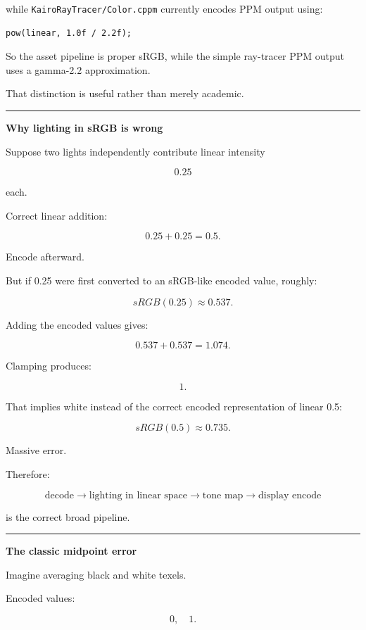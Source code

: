 while \texttt{KairoRayTracer/Color.cppm} currently encodes PPM output using:

\begin{verbatim}
pow(linear, 1.0f / 2.2f);
\end{verbatim}

So the asset pipeline is proper sRGB, while the simple ray-tracer PPM output uses a gamma-2.2 approximation.

That distinction is useful rather than merely academic.

\begin{center}\rule{0.5\linewidth}{0.5pt}\end{center}

\textbf{Why lighting in sRGB is wrong}

Suppose two lights independently contribute linear intensity

\[
0.25
\]

each.

Correct linear addition:

\[
0.25+0.25=0.5.
\]

Encode afterward.

But if 0.25 were first converted to an sRGB-like encoded value, roughly:

\[
sRGB(0.25)\approx0.537.
\]

Adding the encoded values gives:

\[
0.537+0.537=1.074.
\]

Clamping produces:

\[
1.
\]

That implies white instead of the correct encoded representation of linear 0.5:

\[
sRGB(0.5)\approx0.735.
\]

Massive error.

Therefore:

\[
\boxed{
\text{decode}
\rightarrow
\text{lighting in linear space}
\rightarrow
\text{tone map}
\rightarrow
\text{display encode}
}
\]

is the correct broad pipeline.

\begin{center}\rule{0.5\linewidth}{0.5pt}\end{center}

\textbf{The classic midpoint error}

Imagine averaging black and white texels.

Encoded values:

\[
0,\quad1.
\]

